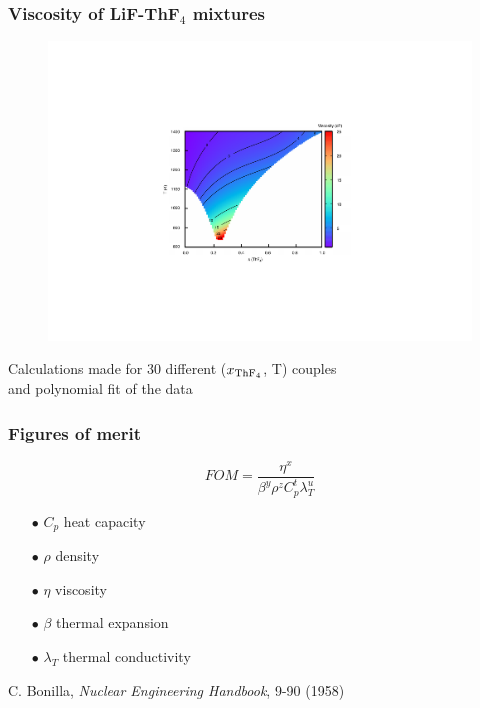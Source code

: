 \documentclass{beamer}
\begin{document}
\begin{frame}
   \frametitle{Viscosity of LiF-ThF$_4$ mixtures}
   \begin{figure}
   \includegraphics[width=.6\textwidth]{viscosity}
   \end{figure}

   Calculations made for 30 different ($x_{\rm ThF_4}$, T) couples\\ and polynomial fit of the data
   
\end{frame}

\begin{frame}
   \frametitle{Figures of merit}
         \[
         FOM=\frac{\eta^x}{\beta^y\rho^z C_p^t \lambda_T^u}
         \]
      \begin{itemize}
      \item[$\bullet$] $C_p$ heat capacity
      \item[$\bullet$] $\rho$ density
      \item[$\bullet$] $\eta$ viscosity
      \item[$\bullet$]  $\beta$ thermal expansion
      \item[$\bullet$] $\lambda_T$ thermal conductivity
   \end{itemize}

\vspace{1cm}
{\scriptsize  C. Bonilla, {\it Nuclear Engineering Handbook}, 9-90 (1958)}
\end{frame}
\end{document}

